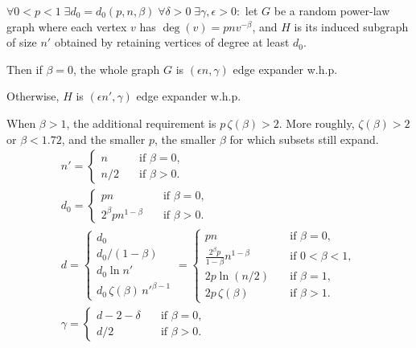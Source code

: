 \begin{theorem}
    \label{thm:powerlaw-permutation-edge-expansion}
    $\forall 0<p<1\;\exists d_0=d_0(p,n,\beta)\;\forall\delta>0\;\exists\gamma,\epsilon>0:$
    let $G$ be a random power-law graph where each vertex $v$ has $\deg(v)=pnv^{-\beta}$,
    and $H$ is its induced subgraph of size $n'$ obtained by retaining vertices of degree at least $d_0$.
    
    Then if $\beta=0$, the whole graph $G$ is $(\epsilon n,\gamma)$ edge expander w.h.p.
    
    Otherwise, $H$ is $(\epsilon n',\gamma)$ edge expander w.h.p.
    
    When $\beta>1$, the additional requirement is $p\,\zeta(\beta)>2$.
    More roughly, $\zeta(\beta)>2$ or $\beta<1.72$,
    and the smaller $p$, the smaller $\beta$ for which subsets still expand.
    \begin{gather}
        n'=
        \begin{cases}
            n & \quad \text{if } \beta=0,\\
            n/2 & \quad \text{if } \beta>0.
        \end{cases}\\
        d_0=
        \begin{cases}
            pn & \quad \text{if } \beta=0,\\
            2^\beta pn^{1-\beta} & \quad \text{if } \beta>0.
        \end{cases}\\
        d=
        \begin{cases}
            d_0\\
            d_0/(1-\beta)\\
            d_0\ln n'\\
            d_0\,\zeta(\beta)\,n'^{\beta-1}
        \end{cases}=
        \begin{cases}
            pn & \quad \text{if } \beta=0,\\
            \frac{2^\beta p}{1-\beta}n^{1-\beta} & \quad \text{if } 0<\beta<1,\\
            2p\ln(n/2) & \quad \text{if } \beta=1,\\
            2p\,\zeta(\beta) & \quad \text{if } \beta>1.
        \end{cases}\\
        \gamma=\begin{cases}
            d-2-\delta & \quad \text{if } \beta=0,\\
            d/2 & \quad \text{if } \beta>0.
        \end{cases}
    \end{gather}
\end{theorem}

